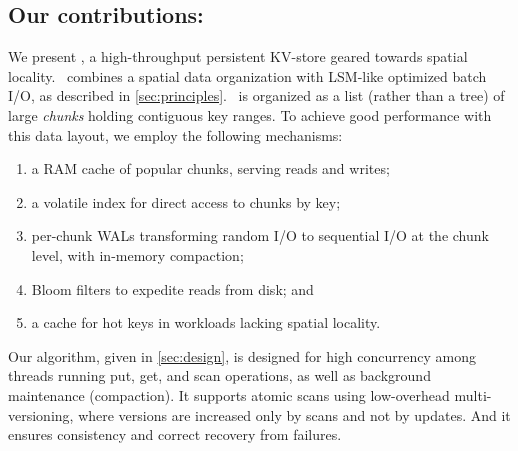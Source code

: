 \subsection{Our contributions: \sys}

We present \sys, a high-throughput persistent KV-store geared towards spatial locality. 
\sys\ combines a spatial data organization with LSM-like optimized batch I/O, as described in \cref{sec:principles}.
\sys\ is organized  as a list (rather than a tree) of large \emph{chunks} holding contiguous key ranges.
%
To achieve good performance with this data layout, we employ the following mechanisms: 

\begin{enumerate} 
     \setlength{\itemindent}{-10pt}
\item
 a RAM cache of popular chunks, serving  reads and writes;  
\item
 a volatile index for direct access to chunks by key; 
\item
 per-chunk WALs  transforming random I/O to sequential I/O at the chunk level, with in-memory compaction; 
\item
Bloom filters to expedite reads from disk; and 
\item 
a   cache for hot keys in workloads lacking spatial locality.
\end{enumerate}

Our algorithm, given in \cref{sec:design}, is designed for high concurrency among threads running put, get, and scan operations, as well as background maintenance (compaction). 
It supports atomic scans using low-overhead multi-versioning, where versions are increased only by scans and not by updates. And it ensures consistency and correct recovery from failures. 





